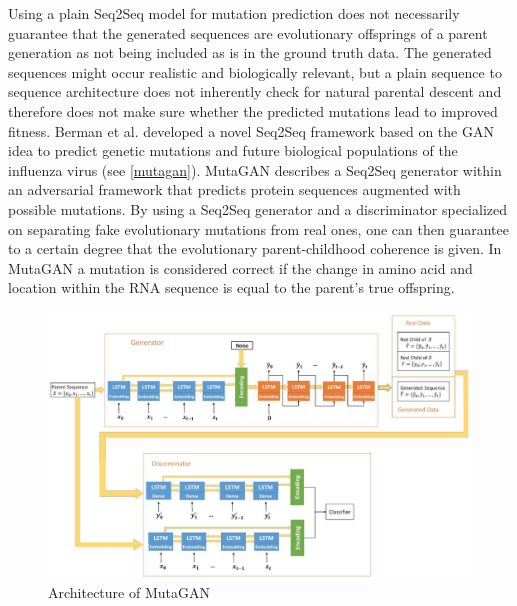 Using a plain \ac{Seq2Seq} model for mutation prediction does not necessarily guarantee that the generated sequences are evolutionary offsprings of a parent generation as not being included as is in the ground truth data. The generated sequences might occur realistic and biologically relevant, but a plain sequence to sequence architecture does not inherently check for natural parental descent and therefore does not make sure whether the predicted mutations lead to improved fitness. Berman et al. \cite{Berman2020} developed a novel \ac{Seq2Seq} framework based on the \ac{GAN} idea to predict genetic mutations and future biological populations of the influenza virus (see \autoref{mutagan}). Muta\-GAN describes a \ac{Seq2Seq} generator within an adversarial framework that predicts protein sequences augmented with possible mutations. By using a \ac{Seq2Seq} generator and a discriminator specialized on separating fake evolutionary mutations from real ones, one can then guarantee to a certain degree that the evolutionary parent-childhood coherence is given. In MutaGAN a mutation is considered correct if the change in amino acid and location within the \ac{RNA} sequence is equal to the parent's true offspring. \cite{Berman2020}

\begin{figure}[ht]
	\centering
	\includegraphics[width=\linewidth]{figures/mutagan.png}
	\caption{Architecture of MutaGAN \cite{Berman2020}}
	\label{mutagan}
\end{figure}

